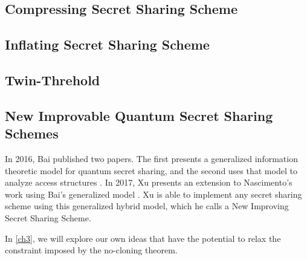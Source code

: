 \subsection{Compressing Secret Sharing Scheme}

\subsection{Inflating Secret Sharing Scheme}

\subsection{Twin-Threhold}



\subsection{New Improvable Quantum Secret Sharing Schemes}

In 2016, Bai published two papers. The first presents a generalized information theoretic model for quantum secret sharing, and the second uses that model to analyze access structures \cite{bai_generalized_2016} \cite{bai_quantum_2017}. In 2017, Xu presents an extension to Nascimento's \cite{nascimento_improving_2001} work using Bai's generalized model \cite{xu_new_2017}. Xu is able to implement any secret sharing scheme using this generalized hybrid model, which he calls a New Improving Secret Sharing Scheme. 

In \cref{ch3}, we will explore our own ideas that have the potential to relax the constraint imposed by the no-cloning theorem.
